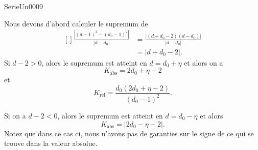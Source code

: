 
\begin{corrige}{SerieUn0009}

	Nous devons d'abord calculer le supremum de
	\begin{equation}
		\begin{aligned}[]
			\frac{ |(d-1)^2-(d_0-1)^2| }{ | d-d_0 | }&=\frac{ | (d+d_0-2)(d-d_0) | }{ | d-d_0 | }\\
				&=| d+d_0-2 |.
		\end{aligned}
	\end{equation}
	Si $d-2>0$, alors le supremum est atteint en $d=d_0+\eta$ et alors on a
	\begin{equation}
		K_{\text{abs}}=2d_0+\eta-2
	\end{equation}
	et
	\begin{equation}
		K_{\text{rel}}=\frac{ d_0(2d_0+\eta-2) }{ (d_0-1)^2 }.
	\end{equation}

	Si on a $d-2<0$, alors le supremum est atteint en $d=d_0-\eta$ et alors
	\begin{equation}
		K_{\text{abs}}=| 2d_0-\eta-2 |.
	\end{equation}
	Notez que dans ce cas ci, nous n'avons pas de garanties sur le signe de ce qui se trouve dans la valeur absolue.

\end{corrige}
